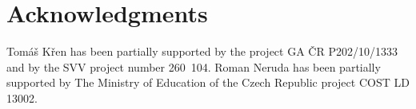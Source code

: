 \documentclass{sig-alternate}
\newenvironment{lizt}
{\begin{easylist}[itemize]}
{\end{easylist}}
\begin{document}
\section{Acknowledgments}

Tomáš Křen has been partially supported by the project GA ČR P202/10/1333 and by the SVV project number 260~104. Roman Neruda has been partially supported by The Ministry of Education of the Czech Republic project COST LD 13002.




%

%
%


\end{document}

